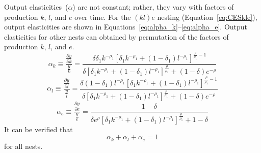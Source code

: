 \documentclass[preprint,10pt,3p]{elsarticle}\usepackage[]{graphicx}\usepackage[]{color}
\begin{document}
Output elasticities~($\alpha$) are not constant;
rather, they vary with factors of production $k$, $l$, and $e$ over time.
For the $(kl)e$ nesting (Equation~\ref{eq:CESkle}),
output elasticities are shown in Equations~\ref{eq:alpha_k}--\ref{eq:alpha_e}.
Output elasticities for other nests can obtained by permutation of
the factors of production $k$, $l$, and $e$.
%
\begin{equation} \label{eq:alpha_k}
  \alpha_k \equiv
  \frac{
  \frac{\partial y}{\partial k} }{
  \frac{y}{k}
  } = \frac{\delta  \delta _1 k^{-\rho _1} \left[\delta _1 k^{-\rho _1}
  	+\left(1 - \delta_1 \right) 
		l^{-\rho _1}\right]{}^{\frac{\rho }{\rho _1}-1}}{\delta  
		\left[\delta _1
     k^{-\rho _1} + \left(1 - \delta _1 \right) l^{-\rho _1} \right]{}^{\frac{\rho }{\rho
     _1}} + (1 - \delta) e^{-\rho }}
\end{equation}
%
\begin{equation} \label{eq:alpha_l}
  \alpha_l \equiv 
  \frac{
  \frac{\partial y}{\partial l} }{
  \frac{y}{l}} =
  \frac{\delta  \left(1-\delta _1\right) l^{-\rho _1}
     \left[\delta _1 k^{-\rho _1}+\left(1 - \delta_1\right) l^{-\rho_1}\right]{}
	 				^{\frac{\rho }{\rho _1}-1}}
		{\delta  \left[\delta _1 k^{-\rho_1} + \left(1 - \delta_1\right) 
					l^{-\rho_1}\right]{}^{\frac{\rho }{\rho _1}}+ (1 - \delta) e^{-\rho }}
\end{equation}
%
\begin{equation} \label{eq:alpha_e}
  \alpha_e \equiv
  \frac{
  \frac{\partial y}{\partial e} }{
  \frac{y}{e}
  } =  \frac{1 - \delta}{\delta  e^{\rho } \left[\delta _1 k^{-\rho_1} 
  			+ \left(1 - \delta_1 \right) l^{-\rho _1}\right]{}
				^{\frac{\rho }{\rho_1}} + 1 - \delta}
\end{equation}
%
It can be verified that
%
\begin{equation} \label{eq:sum_betas}
  \alpha_k + \alpha_l + \alpha_e = 1
\end{equation}
%
for all nests.
\end{document}
